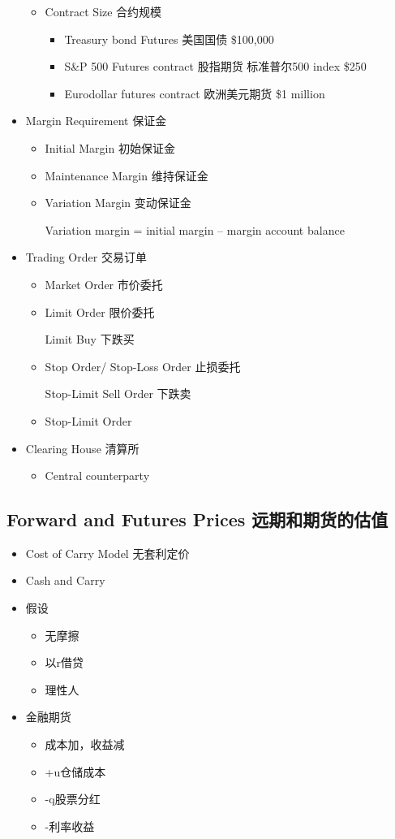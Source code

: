 \documentclass[a4paper,6pt,twoside,openany]{article}
\begin{document}
\begin{itemize}
\begin{itemize}
  \item Contract Size 合约规模
    \begin{itemize}
    \item Treasury bond Futures 美国国债 \$100,000
    \item S\&P 500 Futures contract 股指期货 标准普尔500 index \$250
    \item Eurodollar futures contract 欧洲美元期货 \$1 million
    \end{itemize}
  \end{itemize}
\item Margin Requirement 保证金
  \begin{itemize}
  \item Initial Margin 初始保证金
  \item Maintenance Margin 维持保证金
  \item Variation Margin 变动保证金
    \par Variation margin = initial margin – margin account balance
  \end{itemize}
    
\item Trading Order 交易订单
  \begin{itemize}
  \item Market Order 市价委托
  \item Limit Order 限价委托
    \par Limit Buy 下跌买
  \item Stop Order/ Stop-Loss Order 止损委托
    \par Stop-Limit Sell Order 下跌卖
  \item Stop-Limit Order
  \end{itemize}
    
\item Clearing House 清算所
  \begin{itemize}
  \item Central counterparty
  \end{itemize}
\end{itemize}

\subsection{Forward and Futures Prices 远期和期货的估值}
\begin{itemize}
\item Cost of Carry Model 无套利定价
\item Cash and Carry
\item 假设
  \begin{itemize}
  \item 无摩擦
  \item 以r借贷
  \item 理性人
  \end{itemize}
\item 金融期货
  \begin{itemize}
  \item 成本加，收益减
  \item +u仓储成本
  \item -q股票分红
  \item -利率收益
  \end{itemize}
\end{itemize}
\end{document}
